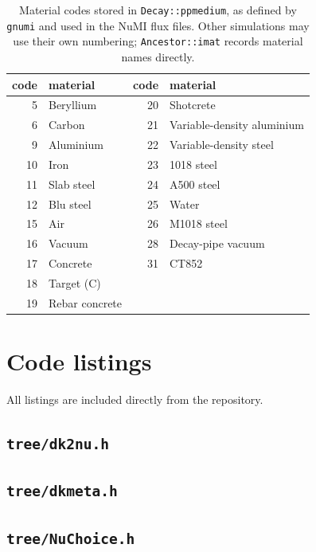\documentclass[11pt]{article}
\newcommand{\code}[1]{\texttt{#1}}
\begin{document}
\begin{table}[htb]
\centering\small
\begin{tabular}{rl@{\qquad}rl}
\toprule
\textbf{code} & \textbf{material} & \textbf{code} & \textbf{material} \\ \midrule
 5 & Beryllium & 20 & Shotcrete \\
 6 & Carbon    & 21 & Variable-density aluminium \\
 9 & Aluminium & 22 & Variable-density steel \\
10 & Iron      & 23 & 1018 steel \\
11 & Slab steel & 24 & A500 steel \\
12 & Blu steel  & 25 & Water \\
15 & Air        & 26 & M1018 steel \\
16 & Vacuum     & 28 & Decay-pipe vacuum \\
17 & Concrete   & 31 & CT852 \\
18 & Target (C) & & \\
19 & Rebar concrete & & \\
\bottomrule
\end{tabular}
\caption{Material codes stored in \code{Decay::ppmedium}, as defined by
\code{gnumi} and used in the NuMI flux files.  Other simulations may use
their own numbering; \code{Ancestor::imat} records material names
directly.}
\label{tab:materials}
\end{table}

\section{Code listings}\label{app:listings}

All listings are included directly from the repository.

\subsection{\code{tree/dk2nu.h}}


\subsection{\code{tree/dkmeta.h}}


\subsection{\code{tree/NuChoice.h}}

\end{document}
